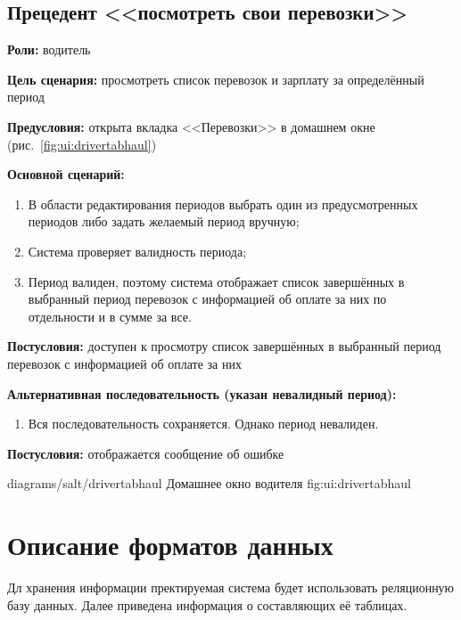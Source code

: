 \subsection{Прецедент <<посмотреть свои перевозки>>}
\textbf{Роли:} водитель \par
\textbf{Цель сценария:} просмотреть список перевозок и 
    зарплату за определённый период \par
\textbf{Предусловия:} открыта вкладка <<Перевозки>> 
    в домашнем окне (рис.~\ref{fig:ui:drivertabhaul}) \par
\textbf{Основной сценарий:} 
\begin{enumerate}
    \item В области редактирования периодов выбрать 
        один из предусмотренных периодов либо задать желаемый период вручную;
    \item Система проверяет валидность периода;
    \item Период валиден, поэтому система отображает список 
        завершённых в выбранный период перевозок с информацией 
        об оплате за них по отдельности и в сумме за все.
\end{enumerate} \par
\textbf{Постусловия:} доступен к просмотру список завершённых 
    в выбранный период перевозок с информацией об оплате за них \par
\textbf{Альтернативная последовательность (указан невалидный период):} \par
\begin{enumerate}
    \item Вся последовательность сохраняется. Однако период невалиден.
\end{enumerate} \par
\textbf{Постусловия:} отображается сообщение об ошибке \par
\image
    {diagrams/salt/drivertabhaul}
    {Домашнее окно водителя}
    {fig:ui:drivertabhaul}



\section{Описание форматов данных}

Дл хранения информации пректируемая система будет использовать реляционную
базу данных. Далее приведена информация о составляющих её таблицах.

\newcommand\dbtable[4]{
    Информация о #1 хранится в базе данных в таблице, структура которой
    представлена далее в таблице \ref{table:db:#2}. #4
    \begin{table}[h!]
        \centering
        \caption{Структура таблицы, хранящей информацию о #1}
        \begin{tabularx}{\textwidth}{|X|X|}
            \hline
            Поле & Тип \\
            \hhline{|=:=|}
            #3
        \end{tabularx}
        \label{table:db:#2}
    \end{table}
}


